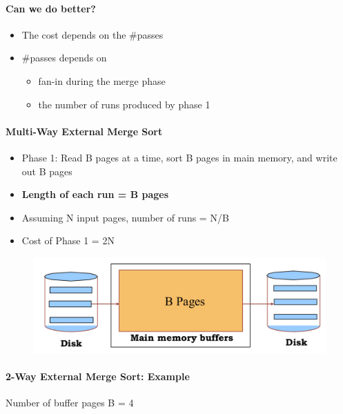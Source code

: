 \paragraph{Can we do better?}
\begin{itemize}
\item The cost depends on the \#passes
\item \#passes depends on
  \begin{itemize}
  \item fan-in during the merge phase
  \item the number of runs produced by phase 1
  \end{itemize}
\end{itemize}



\paragraph{Multi-Way External Merge Sort}
\begin{itemize}
\item Phase 1: Read B pages at a time, sort B pages in main
  memory, and write out B pages
\item \textbf{Length of each run = B pages}
\item Assuming N input pages, number of runs = N/B
\item Cost of Phase 1 = 2N
\end{itemize}

\begin{figure}[h]
  \begin{minipage}{1.0\linewidth}
    \begin{center}
      \includegraphics[scale=0.17]{graphics/multi-way-external-merge-sort}
    \end{center}
  \end{minipage}
\end{figure}



\paragraph{2-Way External Merge Sort: Example}
Number of buffer pages B = 4

